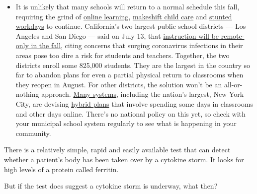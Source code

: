 \begin{itemize}
  \begin{itemize}
  \tightlist
  \item
    It is unlikely that many schools will return to a normal schedule
    this fall, requiring the grind of
    \href{https://www.nytimes.com/2020/06/05/us/coronavirus-education-lost-learning.html?action=click\&pgtype=Article\&state=default\&region=MAIN_CONTENT_3\&context=storylines_faq}{online
    learning},
    \href{https://www.nytimes.com/2020/05/29/us/coronavirus-child-care-centers.html?action=click\&pgtype=Article\&state=default\&region=MAIN_CONTENT_3\&context=storylines_faq}{makeshift
    child care} and
    \href{https://www.nytimes.com/2020/06/03/business/economy/coronavirus-working-women.html?action=click\&pgtype=Article\&state=default\&region=MAIN_CONTENT_3\&context=storylines_faq}{stunted
    workdays} to continue. California's two largest public school
    districts --- Los Angeles and San Diego --- said on July 13, that
    \href{https://www.nytimes.com/2020/07/13/us/lausd-san-diego-school-reopening.html?action=click\&pgtype=Article\&state=default\&region=MAIN_CONTENT_3\&context=storylines_faq}{instruction
    will be remote-only in the fall}, citing concerns that surging
    coronavirus infections in their areas pose too dire a risk for
    students and teachers. Together, the two districts enroll some
    825,000 students. They are the largest in the country so far to
    abandon plans for even a partial physical return to classrooms when
    they reopen in August. For other districts, the solution won't be an
    all-or-nothing approach.
    \href{https://bioethics.jhu.edu/research-and-outreach/projects/eschool-initiative/school-policy-tracker/}{Many
    systems}, including the nation's largest, New York City, are
    devising
    \href{https://www.nytimes.com/2020/06/26/us/coronavirus-schools-reopen-fall.html?action=click\&pgtype=Article\&state=default\&region=MAIN_CONTENT_3\&context=storylines_faq}{hybrid
    plans} that involve spending some days in classrooms and other days
    online. There's no national policy on this yet, so check with your
    municipal school system regularly to see what is happening in your
    community.
  \end{itemize}
\end{itemize}

There is a relatively simple, rapid and easily available test that can
detect whether a patient's body has been taken over by a cytokine storm.
It looks for high levels of a protein called ferritin.

But if the test does suggest a cytokine storm is underway, what then?

